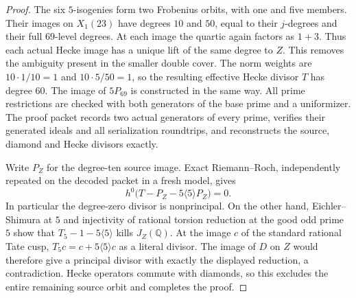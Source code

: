 \begin{proof}
The six $5$-isogenies form two Frobenius orbits, with one and five
members. Their images on $X_1(23)$ have degrees $10$ and $50$,
equal to their $j$-degrees and their full $69$-level degrees.
At each image the quartic again factors as $1+3$.
Thus each actual Hecke image has a unique lift of the same
degree to $Z$. This removes the ambiguity present in the
smaller double cover. The norm weights are
$10\cdot1/10=1$ and $10\cdot5/50=1$, so the resulting effective
Hecke divisor $T$ has degree $60$.
The image of $5P_{69}$ is constructed in the same way.
All prime restrictions are checked with both generators of the
base prime and a uniformizer. The proof packet records two
actual generators of every prime, verifies their generated
ideals and all serialization roundtrips, and reconstructs the
source, diamond and Hecke divisors exactly.

Write $P_Z$ for the degree-ten source image. Exact Riemann--Roch,
independently repeated on the decoded packet in a fresh model,
gives
\[
 h^0\bigl(T-P_Z-5\langle5\rangle P_Z\bigr)=0.
\]
In particular the degree-zero divisor is nonprincipal.
On the other hand, Eichler--Shimura at $5$ and injectivity of
rational torsion reduction at the good odd prime $5$ show that
$T_5-1-5\langle5\rangle$ kills $J_Z(\mathbb Q)$.
At the image $c$ of the standard rational Tate cusp,
$T_5c=c+5\langle5\rangle c$ as a literal divisor.
The image of $D$ on $Z$ would therefore give a principal divisor
with exactly the displayed reduction, a contradiction.
Hecke operators commute with diamonds, so this excludes the
entire remaining source orbit and completes the proof.
\end{proof}
